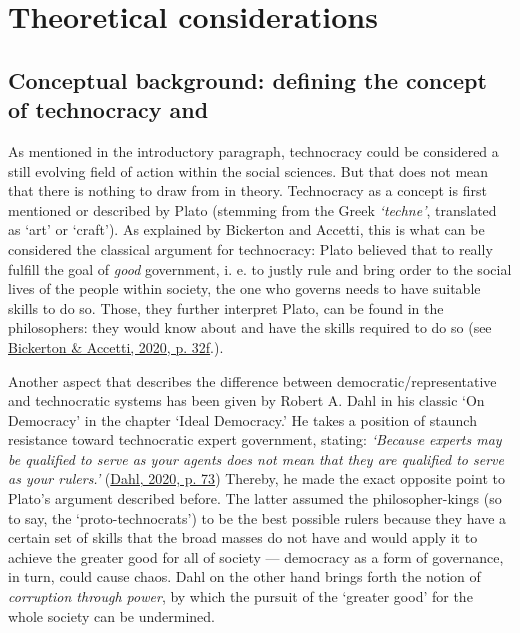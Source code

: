 \documentclass[
  12pt,
  english,
]{article}
\begin{document}
\newpage{}

\hypertarget{theoretical-considerations}{%
\section{Theoretical considerations}\label{theoretical-considerations}}

\hypertarget{conceptual-background-defining-the-concept-of-technocracy-and}{%
\subsection{Conceptual background: defining the concept of technocracy
and}\label{conceptual-background-defining-the-concept-of-technocracy-and}}

As mentioned in the introductory paragraph, technocracy could be
considered a still evolving field of action within the social sciences.
But that does not mean that there is nothing to draw from in theory.
Technocracy as a concept is first mentioned or described by Plato
(stemming from the Greek \emph{`techne'}, translated as `art' or
`craft'). As explained by Bickerton and Accetti, this is what can be
considered the classical argument for technocracy: Plato believed that
to really fulfill the goal of \emph{good} government, i. e. to justly
rule and bring order to the social lives of the people within society,
the one who governs needs to have suitable skills to do so. Those, they
further interpret Plato, can be found in the philosophers: they would
know about and have the skills required to do so (see
\protect\hyperlink{ref-bickerton2020technocracy}{Bickerton \& Accetti,
2020, p. 32f}.).

Another aspect that describes the difference between
democratic/representative and technocratic systems has been given by
Robert A. Dahl in his classic `On Democracy' in the chapter `Ideal
Democracy.' He takes a position of staunch resistance toward
technocratic expert government, stating: \emph{`Because experts may be
qualified to serve as your agents does not mean that they are qualified
to serve as your rulers.'}
(\protect\hyperlink{ref-dahl_onDemocracy}{Dahl, 2020, p. 73}) Thereby,
he made the exact opposite point to Plato's argument described before.
The latter assumed the philosopher-kings (so to say, the
`proto-technocrats') to be the best possible rulers because they have a
certain set of skills that the broad masses do not have and would apply
it to achieve the greater good for all of society --- democracy as a
form of governance, in turn, could cause chaos. Dahl on the other hand
brings forth the notion of \emph{corruption through power}, by which the
pursuit of the `greater good' for the whole society can be undermined.
\end{document}
